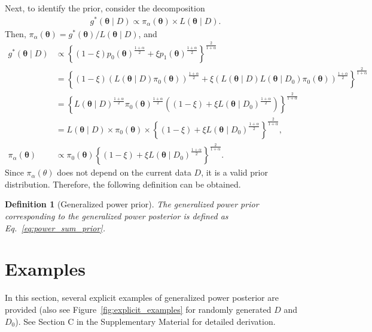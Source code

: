 \documentclass[12pt]{article}
\newtheorem{definition}{Definition}
\begin{document}
Next, to identify the prior, consider the decomposition
\begin{align*}
    g^*(\bm{\theta} \mid D) \propto \pi_\alpha(\bm{\theta}) \times L(\bm{\theta} \mid D).
\end{align*}
Then, $\pi_\alpha(\bm{\theta}) = g^*(\bm{\theta}) / L(\bm{\theta} \mid D)$, and
\begin{align}
    g^*(\bm{\theta} \mid D) &\propto \left\{(1 - \xi)p_0(\bm{\theta})^{\frac{1 + \alpha}{2}} + \xi p_1(\bm{\theta})^{\frac{1 + \alpha}{2}}\right\}^{\frac{2}{1 + \alpha}} \nonumber \\
    &= \left\{(1 - \xi) \left(L(\bm{\theta} \mid D)\pi_0(\bm{\theta})\right)^{\frac{1 + \alpha}{2}} + \xi\left(L(\bm{\theta} \mid D)L(\bm{\theta} \mid D_0)\pi_0(\bm{\theta})\right)^{\frac{1 + \alpha}{2}} \right\}^{\frac{2}{1 + \alpha}} \nonumber \\
    &= \left\{L(\bm{\theta} \mid D)^{\frac{1 + \alpha}{2}}\pi_0(\bm{\theta})^{\frac{1 + \alpha}{2}}\left((1 - \xi) + \xi L(\bm{\theta} \mid D_0)^{\frac{1 + \alpha}{2}}\right)\right\}^{\frac{2}{1 + \alpha}} \nonumber \\
    &= L(\bm{\theta} \mid D) \times \pi_0(\bm{\theta}) \times \left\{(1 - \xi) + \xi L(\bm{\theta} \mid D_0)^{\frac{1 + \alpha}{2}}\right\}^{\frac{2}{1 + \alpha}}, \nonumber \\
    \pi_\alpha(\bm{\theta}) &\propto \pi_0(\bm{\theta}) \left\{(1 - \xi) + \xi L(\bm{\theta} \mid D_0)^{\frac{1 + \alpha}{2}}\right\}^{\frac{2}{1 + \alpha}}. \label{eq:power_sum_prior}
\end{align}
Since $\pi_\alpha(\theta)$ does not depend on the current data $D$, it is a valid prior distribution.
Therefore, the following definition can be obtained.
\begin{definition}[Generalized power prior]
    The generalized power prior corresponding to the generalized power posterior is defined as Eq.~\eqref{eq:power_sum_prior}.
\end{definition}

\section{Examples}
\label{sec:examples}

In this section, several explicit examples of generalized power posterior are provided (also see Figure~\ref{fig:explicit_examples} for randomly generated $D$ and $D_0$).
See Section C in the Supplementary Material for detailed derivation.
\end{document}
